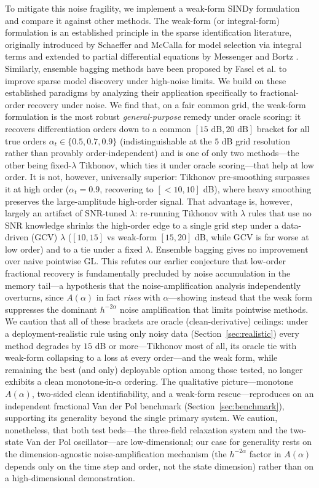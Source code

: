 \documentclass[review,3p,times]{elsarticle}
\begin{document}
To mitigate this noise fragility, we implement a weak-form SINDy formulation and compare it against other methods. The weak-form (or integral-form) formulation is an established principle in the sparse identification literature, originally introduced by Schaeffer and McCalla \cite{schaeffer2017integral} for model selection via integral terms and extended to partial differential equations by Messenger and Bortz \cite{messenger2021wsindy}. Similarly, ensemble bagging methods have been proposed by Fasel et al. \cite{fasel2022ensemble} to improve sparse model discovery under high-noise limits. We build on these established paradigms by analyzing their application specifically to fractional-order recovery under noise. We find that, on a fair common grid, the weak-form formulation is the most robust \emph{general-purpose} remedy under oracle scoring: it recovers differentiation orders down to a common $[15\text{ dB}, 20\text{ dB}]$ bracket for all true orders $\alpha_t \in \{0.5, 0.7, 0.9\}$ (indistinguishable at the $5$ dB grid resolution rather than provably order-independent) and is one of only two methods---the other being fixed-$\lambda$ Tikhonov, which ties it under oracle scoring---that help at low order. It is not, however, universally superior: Tikhonov pre-smoothing surpasses it at high order ($\alpha_t = 0.9$, recovering to $[{<}10,10]$ dB), where heavy smoothing preserves the large-amplitude high-order signal. That advantage is, however, largely an artifact of SNR-tuned $\lambda$: re-running Tikhonov with $\lambda$ rules that use no SNR knowledge shrinks the high-order edge to a single grid step under a data-driven (GCV) $\lambda$ ($[10,15]$ vs weak-form $[15,20]$ dB, while GCV is far worse at low order) and to a tie under a fixed $\lambda$. Ensemble bagging gives no improvement over naive pointwise GL. This refutes our earlier conjecture that low-order fractional recovery is fundamentally precluded by noise accumulation in the memory tail---a hypothesis that the noise-amplification analysis independently overturns, since $A(\alpha)$ in fact \emph{rises} with $\alpha$---showing instead that the weak form suppresses the dominant $h^{-2\alpha}$ noise amplification that limits pointwise methods. We caution that all of these brackets are oracle (clean-derivative) ceilings: under a deployment-realistic rule using only noisy data (Section~\ref{sec:realistic}) every method degrades by $15$ dB or more---Tikhonov most of all, its oracle tie with weak-form collapsing to a loss at every order---and the weak form, while remaining the best (and only) deployable option among those tested, no longer exhibits a clean monotone-in-$\alpha$ ordering. The qualitative picture---monotone $A(\alpha)$, two-sided clean identifiability, and a weak-form rescue---reproduces on an independent fractional Van der Pol benchmark (Section~\ref{sec:benchmark}), supporting its generality beyond the single primary system. We caution, nonetheless, that both test beds---the three-field relaxation system and the two-state Van der Pol oscillator---are low-dimensional; our case for generality rests on the dimension-agnostic noise-amplification mechanism (the $h^{-2\alpha}$ factor in $A(\alpha)$ depends only on the time step and order, not the state dimension) rather than on a high-dimensional demonstration. 
\end{document}
